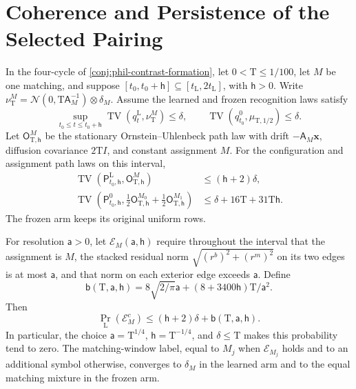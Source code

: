 \section{Coherence and Persistence of the Selected Pairing}
\label{sec:phil-selected-coherence-proof}

In the four-cycle of \cref{conj:phil-contrast-formation}, let
\(0<\mathrm T\le1/100\), let \(M\) be one matching, and suppose
\([t_0,t_0+\mathsf h]\subseteq[t_{\mathrm L},2t_{\mathrm L}]\), with
\(\mathsf h>0\). Write
\(\nu_{\mathrm T}^M=\mathcal N(0,\mathrm T\mathsf A_M^{-1})\otimes\delta_M\).
Assume the learned and frozen recognition laws satisfy
\[
 \sup_{t_0\le t\le t_0+\mathsf h}
 \operatorname{TV}(q_t^{\mathrm L},\nu_{\mathrm T}^M)\le\delta,
 \qquad
 \operatorname{TV}(q_{t_0}^{0},\mu_{\mathrm T,1/2})\le\delta.
\]
Let \(\mathsf O_{\mathrm T,\mathsf h}^M\) be the stationary
Ornstein--Uhlenbeck path law with drift \(-\mathsf A_M\mathbf x\),
diffusion covariance \(2\mathrm TI\), and constant assignment \(M\).
For the configuration and assignment path laws on this interval,
\begin{align}
 \operatorname{TV}(\mathsf P^{\mathrm L}_{t_0,\mathsf h},
                    \mathsf O_{\mathrm T,\mathsf h}^M)
 &\le(\mathsf h+2)\delta,
 \label{eq:phil-selected-path-coupling}\\
 \operatorname{TV}\left(\mathsf P^{0}_{t_0,\mathsf h},
   \tfrac12\mathsf O_{\mathrm T,\mathsf h}^{M_0}
        +\tfrac12\mathsf O_{\mathrm T,\mathsf h}^{M_1}\right)
 &\le\delta+16\mathrm T+31\mathrm T\mathsf h.
 \label{eq:phil-frozen-path-mixture}
\end{align}
The frozen arm keeps its original uniform rows.

For resolution \(\mathsf a>0\), let
\(\mathscr E_M(\mathsf a,\mathsf h)\) require throughout the interval
that the assignment is \(M\), the stacked residual norm
\(\sqrt{(r^b)^2+(r^m)^2}\) on its two edges is at most
\(\mathsf a\), and that norm on each exterior edge exceeds
\(\mathsf a\).
Define
\[
 \mathsf b(\mathrm T,\mathsf a,\mathsf h)
 =8\sqrt{2/\pi}\mathsf a+
            (8+3400\mathsf h)\mathrm T/\mathsf a^2.
\]
Then
\begin{equation}
 \Pr_{\mathrm L}(\mathscr E_M^c)
 \le(\mathsf h+2)\delta+\mathsf b(\mathrm T,\mathsf a,\mathsf h).
 \label{eq:phil-selected-coherence-persistence}
\end{equation}
In particular, the choice
\(\mathsf a=\mathrm T^{1/4}\),
\(\mathsf h=\mathrm T^{-1/4}\), and \(\delta\le\mathrm T\)
makes this probability tend to zero.
The matching-window label, equal to \(M_j\) when
\(\mathscr E_{M_j}\) holds and to an additional symbol otherwise,
converges to \(\delta_M\) in the learned arm and to the equal matching
mixture in the frozen arm.

